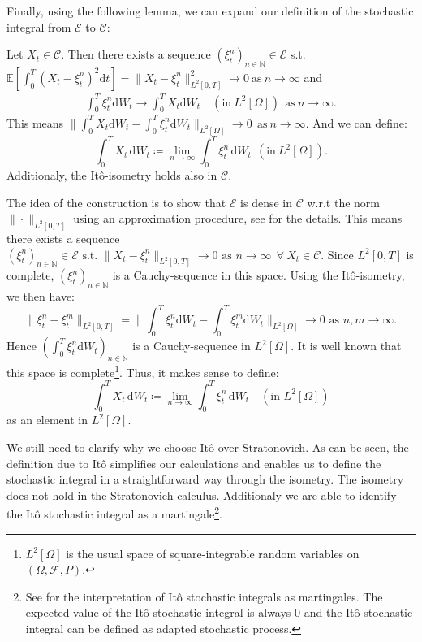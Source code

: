 Finally, using the following lemma, we can expand our definition of the stochastic integral from \(\mathcal{E}\) to \(\mathcal{C}\):
\begin{lemma}
Let \(X_t\in\mathcal{C}\). Then there exists a sequence \(({\xi_{t}^n})_{n\!\in\!\mathbb{N}}\in\mathcal{E}\) s.t.
\(\mathbb{E}[\int_{0}^{T}(X_t-\xi_{t}^n)^2\mathrm{d}t] = \|X_t-\xi_{t}^n\|^2_{L^2[0,T]}\rightarrow 0\:\text{as}\:n\rightarrow\infty\) and 
\begin{align*}
\int_{0}^{T}\xi_t^n\mathrm{d}W_t\rightarrow\int_{0}^{T}X_t\mathrm{d}W_t\quad(\text{in}\:L^2[\Omega])\:\:\text{as}\:n\rightarrow\infty.
\end{align*}
This means \(\|\int_{0}^{T}X_t\mathrm{d}W_t-\int_{0}^{T}\xi_t^n\mathrm{d}W_t\|_{L^2[\Omega]} \rightarrow 0\:\:\text{as}\:n\rightarrow\infty.\)
And we can define:
\[\int_0^T\! X_t\,\mathrm{d}W_{t} \coloneqq\lim_{n\to\infty}\int_0^T\! \xi_t^n\,\mathrm{d}W_{t}  \:\:(\text{in}\:L^2[\Omega]).\]
Additionaly, the It\^o-isometry holds also in \(\mathcal{C}\).
\end{lemma}

The idea of the construction is to show that \(\mathcal{E}\) is dense in \(\mathcal{C}\) w.r.t the norm \(\|\cdot\|_{L^2[0,T]}\) using an approximation procedure, see \cite{Oksendal} for the details.
This means there exists a sequence \((\xi_t^n)_{n\!\in\!\mathbb{N}}\in\mathcal{E} \text{ s.t. } \|X_t-\xi_t^n\|_{L^2[0,T]}\rightarrow 0 \text{ as } n\rightarrow\infty\:\:\forall\: X_t\in\mathcal{C}\).
Since \( L^2[0,T]\) is complete, \(({\xi_t^n})_{n\!\in\!\mathbb{N}}\) is a Cauchy-sequence in this space. Using the It\^o-isometry, we then have:
\[\|\xi_t^n-\xi_t^m\|_{L^2[0,T]} = \|\int_{0}^{T}\xi_t^n\mathrm{d}W_t-\int_{0}^{T}\xi_t^m\mathrm{d}W_t\|_{L^2[\Omega]}\rightarrow 0 \text{ as } n,m\rightarrow\infty.\]
Hence \(({\int_{0}^{T}\xi_t^n}\mathrm{d}W_t)_{n\!\in\!\mathbb{N}}\) is a Cauchy-sequence in \(L^2[\Omega]\). It is well known that this space is complete\footnote{\(L^2[\Omega]\) is the usual space of square-integrable random variables on
\(\left( \Omega , \mathcal{F}, P\right)\).}. 
Thus, it makes sense to define:
\[\int_0^T\! X_t\,\mathrm{d}W_{t} \coloneqq\lim_{n\to\infty}\int_0^T\! \xi_t^n\,\mathrm{d}W_{t} \quad(\text{in }L^2[\Omega])\]
as an element in \(L^2[\Omega]\).

 
We still need to clarify why we choose It\^o over Stratonovich. As can be seen, the definition due to It\^o simplifies our calculations and enables us to define the stochastic integral in a straightforward way through the isometry. The isometry does not hold in the Stratonovich calculus. Additionaly we are able to identify the It\^o stochastic integral as a martingale\footnote{See \cite{Oksendal} for the interpretation of It\^o stochastic integrals as martingales. The expected value of the It\^o stochastic integral is always 0 and the It\^o stochastic integral can be defined as adapted stochastic process.}.


